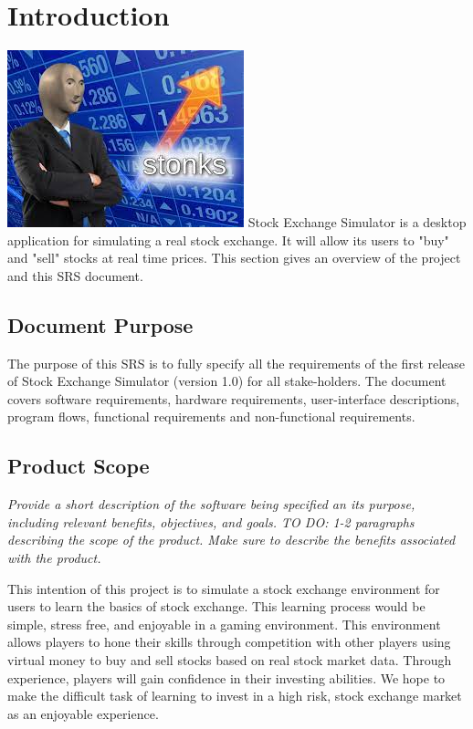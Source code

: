 \documentclass[12 pt, a4paper]{report}
\begin{document}
	
	
	\tableofcontents
	\chapter{Introduction}
	\includegraphics{download}
	Stock Exchange Simulator is a desktop application for simulating a real stock exchange. It will allow its users to "buy" and "sell" stocks at real time prices. This section gives an overview of the project and this SRS document.
	\section {Document Purpose}
	The purpose of this SRS is to fully specify all the requirements of the first release of Stock Exchange Simulator (version 1.0) for all stake-holders. The document covers software requirements, hardware requirements, user-interface descriptions, program flows, functional requirements and non-functional requirements.
	
	\section{Product Scope}
	\textit{Provide a short description of the software being specified an its purpose, including relevant benefits, objectives, and goals. TO DO: 1-2 paragraphs describing the scope of the product. Make sure to describe the benefits associated with the product.}
		
	This intention of this project is to simulate a stock exchange environment for  users to learn the basics of stock exchange. This learning process would be simple, stress free, and enjoyable in a gaming environment. This environment allows players to hone their skills through competition with other players using virtual money to  buy and sell stocks based on real stock market data. Through experience, players will gain confidence in their investing abilities. We hope to make the difficult task of learning to invest in a high risk, stock exchange market as an enjoyable experience.
	
\end{document}
